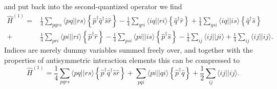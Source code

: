 and put back into the second-quantized operator we find
\begin{equation}
\begin{split}
\hat{H}^{(1)}
=&
\frac{1}{4} \sum_{pqrs} \langle pq || rs \rangle \left\lbrace
 \hat{p}^{\dagger} \hat{q}^{\dagger} \hat{s} \hat{r} \right\rbrace
-
\frac{1}{4} \sum_{qri} \langle iq || ri \rangle 
 \left\lbrace \hat{q}^{\dagger} \hat{r} \right\rbrace
+ 
\frac{1}{4} \sum_{qsi} \langle iq || is \rangle 
 \left\lbrace \hat{q}^{\dagger} \hat{s} \right\rbrace \\
+&
\frac{1}{4} \sum_{pri} \langle pi || ri \rangle 
 \left\lbrace \hat{p}^{\dagger} \hat{r} \right\rbrace  
-
\frac{1}{4} \sum_{psi} \langle pi || is \rangle 
 \left\lbrace \hat{p}^{\dagger} \hat{s} \right\rbrace
-
\frac{1}{4} \sum_{ij} \langle ij || ji \rangle
+
\frac{1}{4} \sum_{ij} \langle ij || ij \rangle .
\end{split}
\end{equation}
Indices are merely dummy variables summed freely over, and together with the properties of antisymmetric interaction elements this can be compressed to 
\begin{equation}
\hat{H}^{(1)}
=
\frac{1}{4} \sum_{pqrs} \langle pq || rs \rangle \left\lbrace
 \hat{p}^{\dagger} \hat{q}^{\dagger} \hat{s} \hat{r} \right\rbrace
+
\sum_{pqi} \langle pi || qi \rangle 
 \left\lbrace \hat{p}^{\dagger} \hat{q} \right\rbrace  
+
\frac{1}{2} \sum_{ij} \langle ij || ij \rangle .
\end{equation}

